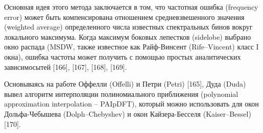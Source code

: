 


Основная идея этого метода заключается в том, что частотная ошибка (frequency error) может быть компенсирована отношением средневзвешенного значения (weighted average) определенного числа известных спектральных бинов вокруг локального максимума. Когда максимум боковых лепестков (sidelobe) выбрано окно распада (MSDW, также известное как Райф-Винсент (Rife–Vincent) класс I окна), ошибка частоты может получить с помощью простых аналитических зависимосытей [166], [167], [168], [169]. 




Основываясь на работе Оффелли (Offelli) и Петри (Petri) [165], 
Дуда (Duda) вывел алгоритм интерполяции полиномиального приближения (polynomial approximation interpolation – PAIpDFT), который можно использовать для окон Дольфа-Чебышева (Dolph–Chebyshev) и окон Кайзера-Бесселя (Kaiser–Bessel) [170]. 

